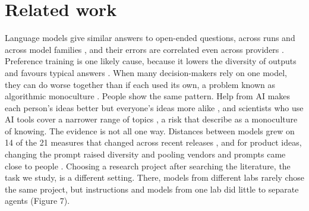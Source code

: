 \documentclass[11pt]{article}
\begin{document}
\section{Related work}\label{related-work}

Language models give similar answers to open-ended questions, across
runs and across model families
\citep{jiang2025hivemind,wenger2025homogeneity,zhang2025noveltybench},
and their errors are correlated even across providers
\citep{kim2025correlated}. Preference training is one likely cause,
because it lowers the diversity of outputs \citep{kirk2024rlhf} and
favours typical answers \citep{zhang2025verbalized}. When many
decision-makers rely on one model, they can do worse together than if
each used its own, a problem known as algorithmic monoculture
\citep{kleinberg2021,bommasani2022}. People show the same pattern. Help
from AI makes each person's ideas better but everyone's ideas more alike
\citep{doshi2024,holzner2025metaanalysis}, and scientists who use AI
tools cover a narrower range of topics \citep{hao2026}, a risk that
\citet{messeri2024} describe as a monoculture of knowing. The evidence
is not all one way. Distances between models grew on 14 of the 21
measures that changed across recent releases \citep{qiu2026homogeneity},
and for product ideas, changing the prompt raised diversity
\citep{meincke2024prompting} and pooling vendors and prompts came close
to people \citep{terwiesch2026productideas}. Choosing a research project
after searching the literature, the task we study, is a different
setting. There, models from different labs rarely chose the same
project, but instructions and models from one lab did little to separate
agents (Figure 7).
\end{document}
